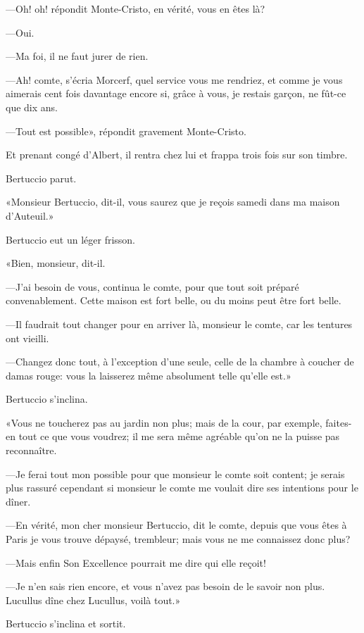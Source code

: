 —Oh! oh! répondit Monte-Cristo, en vérité, vous en êtes là? 

—Oui. 

—Ma foi, il ne faut jurer de rien. 

—Ah! comte, s'écria Morcerf, quel service vous me rendriez, et comme je vous aimerais cent fois davantage encore si, grâce à vous, je restais garçon, ne fût-ce que dix ans. 

—Tout est possible», répondit gravement Monte-Cristo. 

Et prenant congé d'Albert, il rentra chez lui et frappa trois fois sur son timbre. 

Bertuccio parut. 

«Monsieur Bertuccio, dit-il, vous saurez que je reçois samedi dans ma maison d'Auteuil.» 

Bertuccio eut un léger frisson. 

«Bien, monsieur, dit-il. 

—J'ai besoin de vous, continua le comte, pour que tout soit préparé convenablement. Cette maison est fort belle, ou du moins peut être fort belle. 

—Il faudrait tout changer pour en arriver là, monsieur le comte, car les tentures ont vieilli. 

—Changez donc tout, à l'exception d'une seule, celle de la chambre à coucher de damas rouge: vous la laisserez même absolument telle qu'elle est.» 

Bertuccio s'inclina. 

«Vous ne toucherez pas au jardin non plus; mais de la cour, par exemple, faites-en tout ce que vous voudrez; il me sera même agréable qu'on ne la puisse pas reconnaître. 

—Je ferai tout mon possible pour que monsieur le comte soit content; je serais plus rassuré cependant si monsieur le comte me voulait dire ses intentions pour le dîner. 

—En vérité, mon cher monsieur Bertuccio, dit le comte, depuis que vous êtes à Paris je vous trouve dépaysé, trembleur; mais vous ne me connaissez donc plus? 

—Mais enfin Son Excellence pourrait me dire qui elle reçoit! 

—Je n'en sais rien encore, et vous n'avez pas besoin de le savoir non plus. Lucullus dîne chez Lucullus, voilà tout.» 

Bertuccio s'inclina et sortit. 